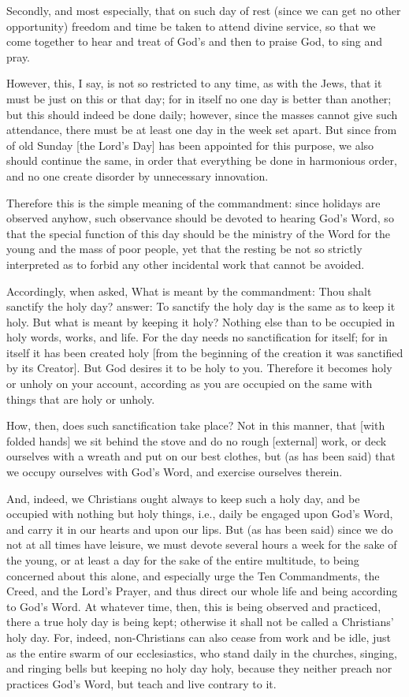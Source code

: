 Secondly, and most especially, that on such day of rest (since we can
get no other opportunity) freedom and time be taken to attend divine
service, so that we come together to hear and treat of God's and then
to praise God, to sing and pray.

However, this, I say, is not so restricted to any time, as with the
Jews, that it must be just on this or that day; for in itself no one
day is better than another; but this should indeed be done daily;
however, since the masses cannot give such attendance, there must be at
least one day in the week set apart. But since from of old Sunday [the
Lord's Day] has been appointed for this purpose, we also should
continue the same, in order that everything be done in harmonious
order, and no one create disorder by unnecessary innovation.

Therefore this is the simple meaning of the commandment: since
holidays are observed anyhow, such observance should be devoted to
hearing God's Word, so that the special function of this day should be
the ministry of the Word for the young and the mass of poor people, yet
that the resting be not so strictly interpreted as to forbid any other
incidental work that cannot be avoided.

Accordingly, when asked, What is meant by the commandment: Thou shalt
sanctify the holy day? answer: To sanctify the holy day is the same as
to keep it holy. But what is meant by keeping it holy? Nothing else
than to be occupied in holy words, works, and life. For the day needs
no sanctification for itself; for in itself it has been created holy
[from the beginning of the creation it was sanctified by its Creator].
But God desires it to be holy to you. Therefore it becomes holy or
unholy on your account, according as you are occupied on the same with
things that are holy or unholy.

How, then, does such sanctification take place? Not in this manner,
that [with folded hands] we sit behind the stove and do no rough
[external] work, or deck ourselves with a wreath and put on our best
clothes, but (as has been said) that we occupy ourselves with God's
Word, and exercise ourselves therein.

And, indeed, we Christians ought always to keep such a holy day, and be
occupied with nothing but holy things, i.e., daily be engaged upon
God's Word, and carry it in our hearts and upon our lips. But (as has
been said) since we do not at all times have leisure, we must devote
several hours a week for the sake of the young, or at least a day for
the sake of the entire multitude, to being concerned about this alone,
and especially urge the Ten Commandments, the Creed, and the Lord's
Prayer, and thus direct our whole life and being according to God's
Word. At whatever time, then, this is being observed and practiced,
there a true holy day is being kept; otherwise it shall not be called a
Christians' holy day. For, indeed, non-Christians can also cease from
work and be idle, just as the entire swarm of our ecclesiastics, who
stand daily in the churches, singing, and ringing bells but keeping no
holy day holy, because they neither preach nor practices God's Word,
but teach and live contrary to it.

